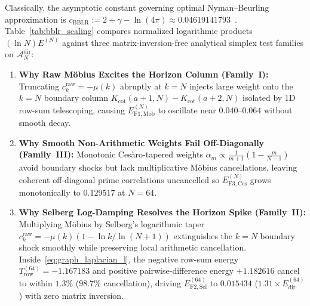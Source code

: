 \documentclass[11pt,a4paper]{article}
\theoremstyle{definition}
\begin{document}
Classically, the asymptotic constant governing optimal Nyman--Beurling approximation is $c_{\mathrm{BBLR}} := 2 + \gamma - \ln(4\pi) \approx 0.04619141793$~\cite{BaezDuarteBalazardLandreauSaias2000,Burnol2002}. Table~\ref{tab:bblr_scaling} compares normalized logarithmic products $(\ln N) E^{(N)}$ against three matrix-inversion-free analytical simplex test families on $\mathcal{A}_N^{\mathrm{dir}}$:
\begin{enumerate}[leftmargin=1.8em,itemsep=2pt]
\item \textbf{Why Raw M\"obius Excites the Horizon Column (Family~I):} Truncating $c_k^{\mathrm{raw}} = -\mu(k)$ abruptly at $k = N$ injects large weight onto the $k = N$ boundary column $K_{\mathrm{cot}}(a+1, N) - K_{\mathrm{cot}}(a+2, N)$ isolated by 1D row-sum telescoping, causing $E_{\mathrm{F1,Mob}}^{(N)}$ to oscillate near $0.040$--$0.064$ without smooth decay.
\item \textbf{Why Smooth Non-Arithmetic Weights Fail Off-Diagonally (Family~III):} Monotonic Ces\`aro-tapered weights $\alpha_m \propto \tfrac{1}{m+1}(1 - \tfrac{m}{N-1})$ avoid boundary shocks but lack multiplicative M\"obius cancellations, leaving coherent off-diagonal prime correlations uncancelled so $E_{\mathrm{F3,Ces}}^{(N)}$ grows monotonically to $0.129517$ at $N=64$.
\item \textbf{Why Selberg Log-Damping Resolves the Horizon Spike (Family~II):} Multiplying M\"obius by Selberg's logarithmic taper~\cite{Selberg1942} $c_k^{\mathrm{raw}} = -\mu(k)(1 - \ln k / \ln(N+1))$ extinguishes the $k=N$ boundary shock smoothly while preserving local arithmetic cancellation. Inside~\eqref{eq:graph_laplacian_l}, the negative row-sum energy $T_{\mathrm{row}}^{(64)} = -1.167183$ and positive pairwise-difference energy $+1.182616$ cancel to within $1.3\%$ ($98.7\%$ cancellation), driving $E_{\mathrm{F2,Sel}}^{(64)}$ to $0.015434$ ($1.31\times E_{\mathrm{dir}}^{(64)}$) with zero matrix inversion.
\end{enumerate}
\end{document}
